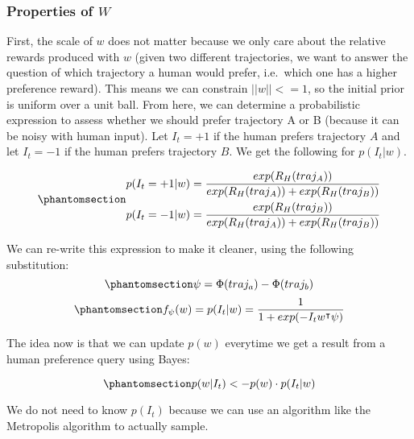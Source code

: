 \documentclass[
  letterpaper,
  numbers=noenddot,
  DIV=11]{scrreprt}
\theoremstyle{definition}
\theoremstyle{plain}
\theoremstyle{plain}
\theoremstyle{remark}
\begin{document}
\subsubsection*{\texorpdfstring{Properties of
\(W\)}{Properties of W}}\label{properties-of-w}

First, the scale of \(w\) does not matter because we only care about the
relative rewards produced with \(w\) (given two different trajectories,
we want to answer the question of which trajectory a human would prefer,
i.e.~which one has a higher preference reward). This means we can
constrain \(||w|| <= 1\), so the initial prior is uniform over a unit
ball. From here, we can determine a probabilistic expression to assess
whether we should prefer trajectory A or B (because it can be noisy with
human input). Let \(I_t = +1\) if the human prefers trajectory \(A\) and
let \(I_t = -1\) if the human prefers trajectory \(B\). We get the
following for \(p(I_t | w)\).

\begin{equation}\phantomsection\label{eq-eq3.37}{\begin{aligned}
p(I_t = +1|w) &= \frac{exp(R_H(traj_A))}{exp(R_H(traj_A)) + exp(R_H(traj_B))}\\
p(I_t = -1|w) &= \frac{exp(R_H(traj_B))}{exp(R_H(traj_A)) + exp(R_H(traj_B))}
\end{aligned}}\end{equation}

We can re-write this expression to make it cleaner, using the following
substitution:
\begin{equation}\phantomsection\label{eq-eq3.38}{\psi = \Phi(traj_a) - \Phi(traj_b)}\end{equation}
\begin{equation}\phantomsection\label{eq-eq3.39}{f_{\psi} (w) = p(I_t|w) = \frac{1}{1 + exp(-I_tw^{\intercal}\psi)}}\end{equation}

The idea now is that we can update \(p(w)\) everytime we get a result
from a human preference query using Bayes:

\begin{equation}\phantomsection\label{eq-eq3.40}{p(w|I_t) <- p(w) \cdot p(I_t|w)}\end{equation}

We do not need to know \(p(I_t)\) because we can use an algorithm like
the Metropolis algorithm to actually sample.
\end{document}
